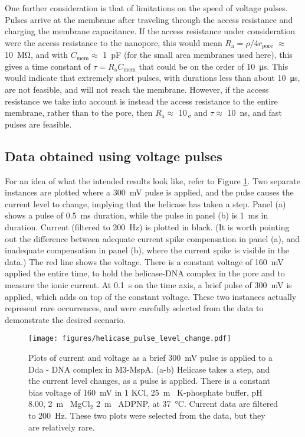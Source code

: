 One further consideration is that of limitations on the speed of voltage pulses.  Pulses arrive at the membrane after traveling through the access resistance and charging the membrane capacitance.  If the access resistance under consideration were the access resistance to the nanopore, this would mean $R_{\text{a}} = \rho / 4 r_{\text{pore}}$ \citep{Hall1975} $ \approx $ \SI{10}{\mega\ohm}, and with $C_{\text{mem}} \approx $ \SI{1}{\pico\F} (for the small area membranes used here), this gives a time constant of $\tau = R_{\text{a}} C_{\text{mem}}$ that could be on the order of \SI{10}{\micro\s}.  This would indicate that extremely short pulses, with durations less than about \SI{10}{\micro\s}, are not feasible, and will not reach the membrane.  However, if the access resistance we take into account is instead the access resistance to the entire membrane, rather than to the pore, then $R_{\text{a}} \approx $ \SI{10}{\k\ohm}, and $\tau \approx $ \SI{10}{\ns}, and fast pulses are feasible.

\subsection{Data obtained using voltage pulses}

For an idea of what the intended results look like, refer to Figure \ref{fig:helicase_pulse}.  Two separate instances are plotted where a \SI{300}{\mV} pulse is applied, and the pulse causes the current level to change, implying that the helicase has taken a step.  Panel (a) shows a pulse of \SI{0.5}{\ms} duration, while the pulse in panel (b) is \SI{1}{\ms} in duration.  Current (filtered to \SI{200}{\Hz}) is plotted in black.  (It is worth pointing out the difference between adequate current spike compensation in panel (a), and inadequate compensation in panel (b), where the current spike is visible in the data.)  The red line shows the voltage.  There is a constant voltage of \SI{160}{\mV} applied the entire time, to hold the helicase-DNA complex in the pore and to measure the ionic current.  At \SI{0.1}{\s} on the time axis, a brief pulse of \SI{300}{\mV} is applied, which adds on top of the constant voltage.  These two instances actually represent rare occurrences, and were carefully selected from the data to demonstrate the desired scenario.

\begin{figure}[h]
\begin{centering}
\texttt{[image: figures/helicase\_pulse\_level\_change.pdf]}
\caption[Voltage pulse can induce a helicase step]{Plots of current and voltage as a brief \SI{300}{\mV} pulse is applied to a Dda - DNA complex in  M3-MspA.  (a-b) Helicase takes a step, and the current level changes, as a pulse is applied.  There is a constant bias voltage of \SI{160}{\mV} in \SI{1}{\Molar} KCl, \SI{25}{\m\Molar} K-phosphate buffer, pH \num{8.00}, \SI{2}{\m\Molar} MgCl$_2$ \SI{2}{\m\Molar} ADPNP, at \SI{37}{\celsius}.  Current data are filtered to \SI{200}{\Hz}.  These two plots were selected from the data, but they are relatively rare.}
\label{fig:helicase_pulse}
\end{centering}
\end{figure}

